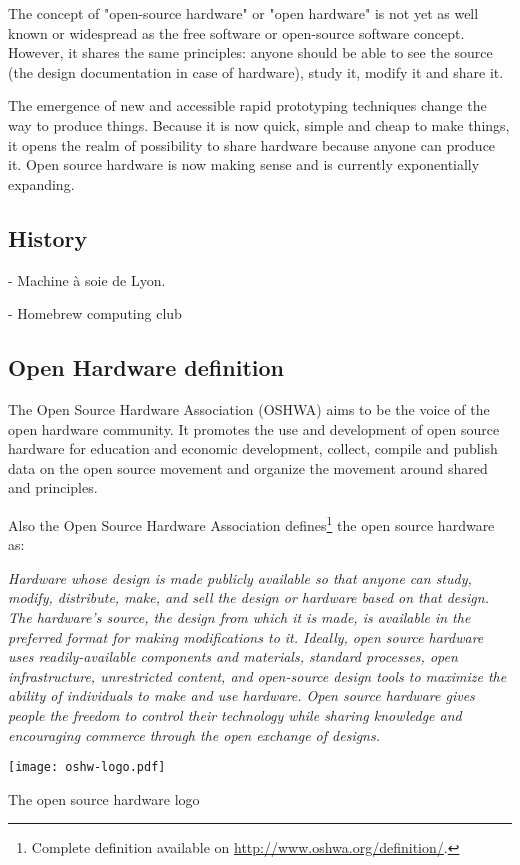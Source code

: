 The concept of "open-source hardware" or "open hardware" is not yet as well known or widespread as the free software or open-source software concept. However, it shares the same principles: anyone should be able to see the source (the design documentation in case of hardware), study it, modify it and share it.

The emergence of new and accessible rapid prototyping techniques change the way to produce things. Because it is now quick, simple and cheap to make things, it opens the realm of possibility to share hardware because anyone can produce it. Open source hardware is now making sense and is currently exponentially expanding.

\subsection{History} %
- Machine à soie de Lyon.

- Homebrew computing club
\subsection{Open Hardware definition} %

The Open Source Hardware Association (OSHWA) aims to be the voice of the open hardware community. It promotes the use and development of open source hardware for education and economic development, collect, compile and publish data on the open source movement and organize the movement around shared and principles.

Also the Open Source Hardware Association defines\footnote{Complete definition available on \url{http://www.oshwa.org/definition/}.} the open source hardware as:

\begin{row}{4}{2}
    \begin{cell}{3}
        \emph{Hardware whose design is made publicly available so that anyone can study, modify, distribute, make, and sell the design or hardware based on that design. The hardware’s source, the design from which it is made, is available in the preferred format for making modifications to it. Ideally, open source hardware uses readily-available components and materials, standard processes, open infrastructure, unrestricted content, and open-source design tools to maximize the ability of individuals to make and use hardware. Open source hardware gives people the freedom to control their technology while sharing knowledge and encouraging commerce through the open exchange of designs.}
    \end{cell}
    \begin{cell}{1}
        \begin{NFfigure}
            \centering
                \texttt{[image: oshw-logo.pdf]}
            \caption{The open source hardware logo}
            \label{fig:ohw-logo}
        \end{NFfigure}
    \end{cell}
\end{row}


